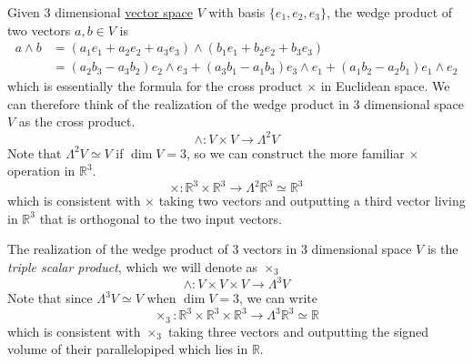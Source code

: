 	\begin{example}
	  \label{ex:cross-product}
    Given 3 dimensional \hyperref[def:vector-space]{vector space} $V$ with basis $\{e_1, e_2, e_3\}$, the wedge product of two vectors $a, b \in V$ is 
    \begin{align}
      a \wedge b & = (a_1 e_1 + a_2 e_2 + a_3 e_3) \wedge (b_1 e_1 + b_2 e_2 + b_3 e_3) \\
      & = (a_2 b_3 - a_3 b_2) e_2 \wedge e_3 + (a_3 b_1 - a_1 b_3) e_3 \wedge e_1 + (a_1 b_2 - a_2 b_1) e_1 \wedge e_2 
    \end{align}
    which is essentially the formula for the cross product $\times$ in Euclidean space. We can therefore think of the realization of the wedge product in 3 dimensional space $V$ as the cross product. 
		\begin{equation}
    	\wedge: V \times V \to \Lambda^2 V
		\end{equation}
    Note that $\Lambda^2 V \simeq V$ if $\dim{V} = 3$, so we can construct the more familiar $\times$ operation in $\mathbb{R}^3$. 
		\begin{equation}
    	\times: \mathbb{R}^3 \times \mathbb{R}^3 \to \Lambda^2 \mathbb{R}^3 \simeq \mathbb{R}^3
		\end{equation}
    which is consistent with $\times$ taking two vectors and outputting a third vector living in $\mathbb{R}^3$ that is orthogonal to the two input vectors. 
  \end{example}

	\begin{example}
	  \label{ex:triple-scalar-product}
    The realization of the wedge product of 3 vectors in 3 dimensional space $V$ is the \textit{triple scalar product}, which we will denote as $\times_3$
		\begin{equation}
    	\wedge: V \times V \times V \to \Lambda^3 V
		\end{equation}
    Note that since $\Lambda^3 V \simeq V$ when $\dim{V} = 3$, we can write 
		\begin{equation}
    	\times_3: \mathbb{R}^3 \times \mathbb{R}^3 \times \mathbb{R}^3 \to \Lambda^3 \mathbb{R}^3 \simeq \mathbb{R}
		\end{equation}
    which is consistent with $\times_3$ taking three vectors and outputting the signed volume of their parallelopiped which lies in $\mathbb{R}$. 
  \end{example}

